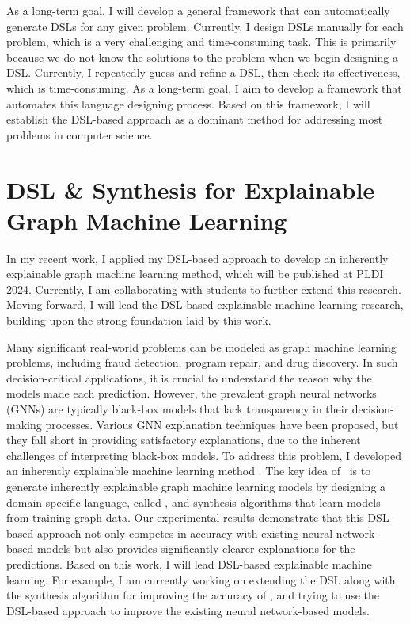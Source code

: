 \documentclass[11pt]{article}
\newcommand{\myparagraph}[1]{\medskip\noindent{\it \textbf{#1.}}}
\begin{document}
As a long-term goal, I will develop a general framework that can automatically generate DSLs for any given problem. 
%
Currently, I design DSLs manually for each problem, which is a very challenging and time-consuming task. 
%
This is primarily because we do not know the solutions to the problem when we begin designing a DSL.
%
Currently, I repeatedly guess and refine a DSL, then check its effectiveness, which is time-consuming.
%
As a long-term goal, I aim to develop a framework that automates this language designing process.
%
Based on this framework, I will establish the DSL-based approach as a dominant method for addressing most problems in computer science.



\section{DSL \& Synthesis for Explainable Graph Machine Learning}
%
In my recent work, I applied my DSL-based approach to develop an inherently explainable graph machine learning method, which will be published at PLDI 2024.
%
Currently, I am collaborating with students to further extend this research.
%
Moving forward, I will lead the DSL-based explainable machine learning research, building upon the strong foundation laid by this work.


\myparagraph{PL4XGL}
Many significant real-world problems can be modeled as graph machine learning problems, including fraud detection, program repair, and drug discovery.
%
In such decision-critical applications, it is crucial to understand the reason why the models made each prediction.
%
However, the prevalent graph neural networks (GNNs) are typically black-box models that lack transparency in their decision-making processes.
%
Various GNN explanation techniques have been proposed, but they fall short in providing satisfactory explanations, due to the inherent challenges of interpreting black-box models. 
%
To address this problem, I developed an inherently explainable machine learning method {\PLXGL}.
%
The key idea of \PLXGL~is to generate inherently explainable graph machine learning models by designing a domain-specific language, called \GDL, and synthesis algorithms that learn models from training graph data.
%
Our experimental results demonstrate that this DSL-based approach not only competes in accuracy with existing neural network-based models but also provides significantly clearer explanations for the predictions.
%
Based on this work, I will lead DSL-based explainable machine learning.
%
For example, I am currently working on extending the DSL along with the synthesis algorithm for improving the accuracy of {\PLXGL}, and trying to use the DSL-based approach to improve the existing neural network-based models.
\end{document}
